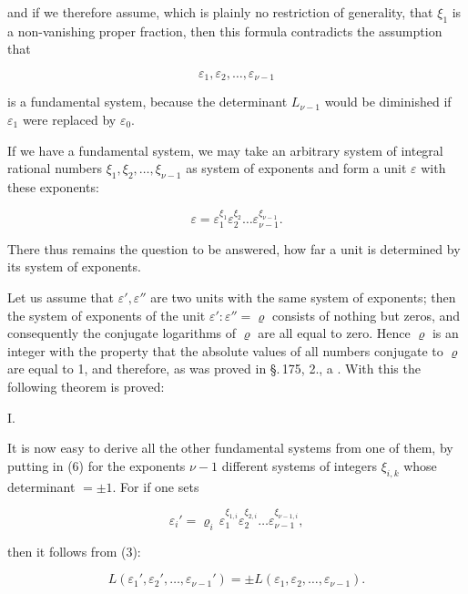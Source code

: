 and if we therefore assume, which is plainly no restriction of
generality, that $\xi_1$ is a non-vanishing proper fraction, then this
formula contradicts the assumption that

\[
\varepsilon_1, \varepsilon_2, \ldots, \varepsilon_{\nu-1}
\]

is a fundamental system, because the determinant $L_{\nu-1}$ would be
 diminished if $\varepsilon_1$ were replaced by $\varepsilon_0$.

If we have a fundamental system, we may take an arbitrary
 system of integral rational numbers $\xi_1, \xi_2, \ldots, \xi_{\nu-1}$ as
system of exponents and form a unit $\varepsilon$ with these exponents:

\[
\varepsilon = \varepsilon_1^{\xi_1} \varepsilon_2^{\xi_2} \ldots \varepsilon_{\nu-1}^{\xi_{\nu-1}}.
\]

There thus remains the question to be answered, how far
a unit is determined by its system of exponents.

Let us assume that $\varepsilon', \varepsilon''$ are two units with the same
system of exponents; then the system of exponents of the
unit $\varepsilon' : \varepsilon'' = \varrho$ consists of nothing but zeros, and consequently the conjugate
 logarithms of $\varrho$ are all equal to zero. Hence $\varrho$ is an
integer with the property that the absolute values of all
numbers conjugate to $\varrho$ are equal to 1, and therefore, as was proved in
\S.\,175, 2., a . With this the
following theorem is proved:

I. 





It is now easy to derive all the other fundamental systems
from one of them, by putting in (6) for the exponents $\nu - 1$ different
 systems of integers $\xi_{i,k}$ whose determinant
$= \pm 1$. For if one sets

\[
\varepsilon_i' = \varrho_i\, \varepsilon_1^{\xi_{1,i}} \varepsilon_2^{\xi_{2,i}} \ldots \varepsilon_{\nu-1}^{\xi_{\nu-1,i}},
\]

then it follows from (3):

\[
L(\varepsilon_1', \varepsilon_2', \ldots, \varepsilon_{\nu-1}') = \pm L(\varepsilon_1, \varepsilon_2, \ldots, \varepsilon_{\nu-1}).
\]
